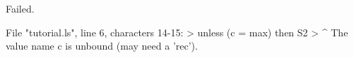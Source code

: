 \runverbatimfalse
{}
\begin{RunVerbatimMsg}
Failed.
\end{RunVerbatimMsg}
\begin{RunVerbatimErr}
File "tutorial.ls", line 6, characters 14-15:
>      unless (c = max) then S2
>              ^
The value name c is unbound (may need a 'rec').
\end{RunVerbatimErr}
